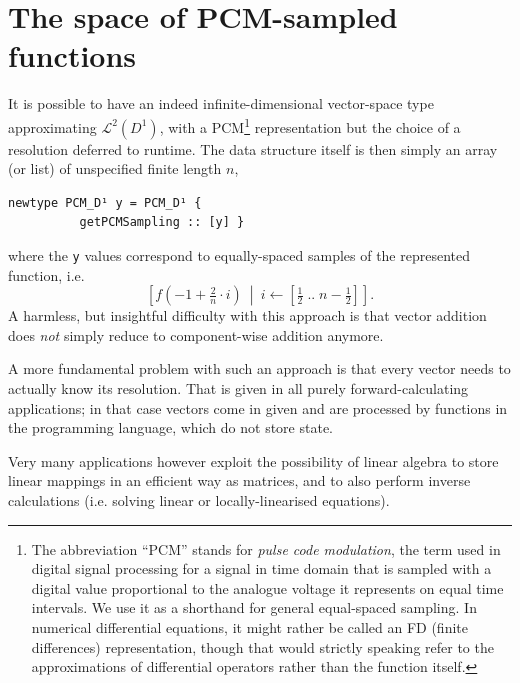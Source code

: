 \documentclass[sigplan,review,anonymous]{acmart}\settopmatter{printfolios=true,printccs=false,printacmref=false}
\begin{document}
\section{The space of PCM-sampled functions}
It is possible to have an indeed infinite-dimensional vector-space type approximating $\mathcal{L}^2(D^1)$, with a PCM\footnote{%
The abbreviation “PCM” stands for \emph{pulse code modulation}, the term used in digital signal processing for a signal in time domain that is sampled with a digital value proportional to the analogue voltage it represents on equal time intervals. We use it as a shorthand for general equal-spaced sampling. In numerical differential equations, it might rather be called an FD (finite differences) representation, though that would strictly speaking refer to the approximations of differential operators rather than the function itself.
} representation but the choice of a resolution deferred to runtime. The data structure itself is then simply an array (or list) of unspecified finite length $n$,
\begin{lstlisting}
newtype PCM_D¹ y = PCM_D¹ {
          getPCMSampling :: [y] }
\end{lstlisting}
where the \lstinline`y` values correspond to equally-spaced samples of the represented function, i.e.
\[
  \left[f(-1 + \tfrac2n\cdot i)\ \middle|\ i\leftarrow[\tfrac12\;..\;n-\tfrac12]\right].
\]
A harmless, but insightful difficulty with this approach is that vector addition does \emph{not} simply reduce to component-wise addition anymore.

A more fundamental problem with such an approach is that every vector needs to actually know its resolution. That is given in all purely forward-calculating applications; in that case vectors come in given and are processed by functions in the programming language, which do not store state.

Very many applications however exploit the possibility of linear algebra to store linear mappings in an efficient way as matrices, and to also perform inverse calculations (i.e. solving linear or locally-linearised equations).
\end{document}
